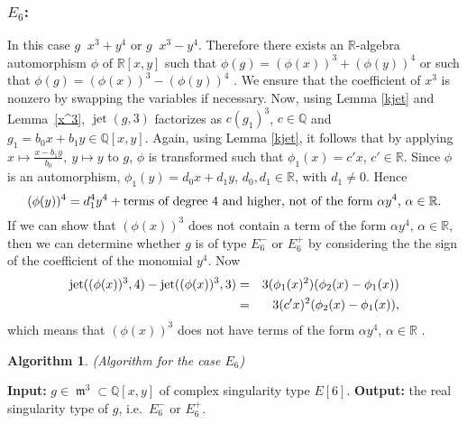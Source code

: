 \documentclass[noend]{amsproc}
\DeclareMathOperator{\requiv}{\overset{r}{\sim}}
\DeclareMathOperator{\m}{\mathfrak{m}}
\DeclareMathOperator{\jt}{jet}
\begin{document}
\subsubsection{$E_6$:}In this case $g\requiv x^3+y^4$ or $g\requiv x^3-y^4$.
Therefore there exists an $\mathbb
R$-algebra automorphism $\phi$ of $\mathbb R[x,y]$ such that
$\phi(g)=(\phi(x))^3+(\phi(y))^4$ or such that
$\phi(g)=(\phi(x))^3-(\phi(y))^4$ . We ensure that the
coefficient of
$x^3$ is nonzero by swapping the variables if necessary. Now, using Lemma
\ref{kjet} and Lemma~\ref{x^3}, $\jt(g,3)$ factorizes as
$c(g_1)^3$, $c\in\mathbb Q$ and $g_1=b_0x+b_1y\in\mathbb
Q[x,y]$. Again,
using Lemma \ref{kjet}, it follows that by applying
$x\mapsto\frac{x-b_1y}{b_0},\
y\mapsto y$ to $g$, $\phi$ is transformed such that $\phi_1(x)=c'x$,
$c'\in\mathbb
R$. Since $\phi$ is an automorphism, $\phi_1(y)=d_0x+d_1y$,
$d_0,d_1\in\mathbb R$,
with $d_1\neq 0$. Hence
\begin{equation*}
(\phi(y))^4=d_1^4y^4+\textnormal{terms of degree 4 and higher, not of the
form $\alpha y^4$, $\alpha\in\mathbb R$.}
\end{equation*}
If we can show that $(\phi(x))^3$ does not contain a term of the form
$\alpha y^4$, $\alpha\in\mathbb R$, then we can determine whether $g$
is of type $E_6^-$ or $E_6^+$ by considering the the sign of the coefficient of
the monomial $y^4$. Now
\begin{eqnarray*}
\textnormal{jet}((\phi(x))^3,4)-\textnormal{jet}((\phi(x))^3,3)
&=&3(\phi_1(x)^2)(\phi_2(x)-\phi_1(x))\\
&=&3(c'x)^2(\phi_2(x)-\phi_1(x)),
\end{eqnarray*}
 which means that $(\phi(x))^3$ does not have terms of the form $\alpha y^4$,
 $\alpha\in\mathbb R$ .
\newtheorem{E[6]}[kjet]{Algorithm}
\begin{E[6]}(Algorithm for the case $E_6$)\label{E[6]}
\end{E[6]}
\noindent\textnormal{\bf Input:} $g\in \m^3\subset\mathbb Q[x,y]$ of complex
singularity type $E[6]$.\newline
\textnormal{\bf Output:} the real singularity type of $g$, i.e.~$E_6^-$
or $E_6^+$.
\end{document}
